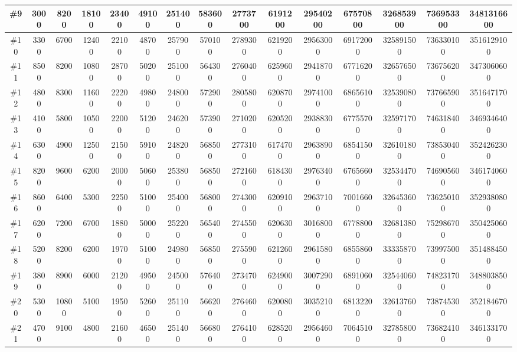 \documentclass[titlepage]{article}
\begin{document}
\begin{landscape}
\begin{table}[h]
\begin{tabular}{|c|c|c|c|c|c|c|c|c|c|c|c|c|c|c|}
			\hline
			\#9      & 3000   & 8200  & 18100 & 23400 & 49100 & 251400 & 583600 & 2773700 & 6191200 & 29540200 & 67570800 & 326853900 & 736953300 & 3481316600  \\ 
			\hline
			\#10     & 3300   & 6700  & 12400 & 22100 & 48700 & 257900 & 570100 & 2789300 & 6219200 & 29563000 & 69172000 & 325891500 & 736330100 & 3516129100  \\ 
			\hline
			\#11     & 8500   & 8200  & 10800 & 28700 & 50200 & 251000 & 564300 & 2760400 & 6259600 & 29418700 & 67716200 & 326576500 & 736756200 & 3473060600  \\ 
			\hline
			\#12     & 4800   & 8300  & 11600 & 22200 & 49800 & 248000 & 572900 & 2805800 & 6208700 & 29741000 & 68656100 & 325390800 & 737665900 & 3516471700  \\ 
			\hline
			\#13     & 4100   & 5800  & 10500 & 22000 & 51200 & 246200 & 573900 & 2710200 & 6205200 & 29388300 & 67755700 & 325971700 & 746318400 & 3469346400  \\ 
			\hline
			\#14     & 6300   & 4900  & 12500 & 21500 & 59100 & 248200 & 568500 & 2773100 & 6174700 & 29638900 & 68541500 & 326101800 & 738530400 & 3524262300  \\ 
			\hline
			\#15     & 8200   & 9600  & 6200  & 20000 & 50600 & 253800 & 568500 & 2721600 & 6184300 & 29763400 & 67656600 & 325344700 & 746905600 & 3461740600  \\ 
			\hline
			\#16     & 8600   & 6400  & 5300  & 22500 & 51000 & 254000 & 568000 & 2743000 & 6209100 & 29637100 & 70016600 & 326453600 & 736250100 & 3529380800  \\ 
			\hline
			\#17     & 6200   & 7200  & 6700  & 18800 & 50000 & 252200 & 565400 & 2745500 & 6206300 & 30168000 & 67788000 & 326813800 & 752986700 & 3504250600  \\ 
			\hline
			\#18     & 5200   & 8200  & 6200  & 19700 & 51000 & 249800 & 568500 & 2755900 & 6212600 & 29615800 & 68558600 & 333358700 & 739975000 & 3514884500  \\ 
			\hline
			\#19     & 3800   & 8900  & 6000  & 21200 & 49500 & 245000 & 576400 & 2734700 & 6249000 & 30072900 & 68910600 & 325440600 & 748231700 & 3488038500  \\ 
			\hline
			\#20     & 5300   & 10800 & 5100  & 19500 & 52600 & 251100 & 566200 & 2764600 & 6200800 & 30352100 & 68132200 & 326137600 & 738745300 & 3521846700  \\ 
			\hline
			\#21     & 4700   & 9100  & 4800  & 21600 & 46500 & 251400 & 566800 & 2764100 & 6285200 & 29564600 & 70645100 & 327858000 & 736824100 & 3461331700  \\ 

\end{tabular}
\end{table}
\end{landscape}
\end{document}
